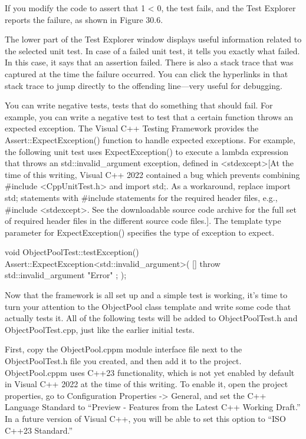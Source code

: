 
If you modify the code to assert that 1 < 0, the test fails, and the Test Explorer reports the failure, as shown in Figure 30.6.


The lower part of the Test Explorer window displays useful information related to the selected unit test. In case of a failed unit test, it tells you exactly what failed. In this case, it says that an assertion failed. There is also a stack trace that was captured at the time the failure occurred. You can click the hyperlinks in that stack trace to jump directly to the offending line—very useful for debugging.


You can write negative tests, tests that do something that should fail. For example, you can write a negative test to test that a certain function throws an expected exception. The Visual C++ Testing Framework provides the Assert::ExpectException() function to handle expected exceptions. For example, the following unit test uses ExpectException() to execute a lambda expression that throws an std::invalid\_argument exception, defined in <stdexcept>[At the time of this writing, Visual C++ 2022 contained a bug which prevents combining \#include <CppUnitTest.h> and import std;. As a workaround, replace import std; statements with \#include statements for the required header files, e.g., \#include <stdexcept>. See the downloadable source code archive for the full set of required header files in the different source code files.]. The template type parameter for ExpectException() specifies the type of exception to expect.

\begin{cpp}
void ObjectPoolTest::testException()
{
    Assert::ExpectException<std::invalid_argument>(
        []{ throw std::invalid_argument { "Error" }; });
}
\end{cpp}


Now that the framework is all set up and a simple test is working, it’s time to turn your attention to the ObjectPool class template and write some code that actually tests it. All of the following tests will be added to ObjectPoolTest.h and ObjectPoolTest.cpp, just like the earlier initial tests.

First, copy the ObjectPool.cppm module interface file next to the ObjectPoolTest.h file you created, and then add it to the project. ObjectPool.cppm uses C++23 functionality, which is not yet enabled by default in Visual C++ 2022 at the time of this writing. To enable it, open the project properties, go to Configuration Properties -> General, and set the C++ Language Standard to “Preview - Features from the Latest C++ Working Draft.” In a future version of Visual C++, you will be able to set this option to “ISO C++23 Standard.”

